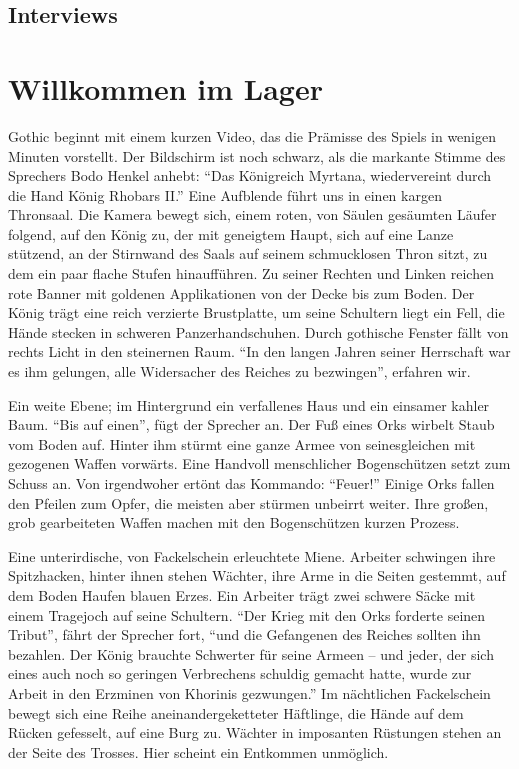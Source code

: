 \documentclass[a5paper,pagesize,numbers=noenddot]{scrbook}
\begin{document}
\section{Interviews}\label{ch:quellen_interviews}


\chapter{Willkommen im Lager}\label{ch:willkommen}
Gothic beginnt mit einem kurzen Video, das die Prämisse des Spiels in wenigen Minuten vorstellt.
Der Bildschirm ist noch schwarz, als die markante Stimme des Sprechers Bodo Henkel anhebt:
\enquote{Das Königreich Myrtana, wiedervereint durch die Hand König Rhobars II.}
Eine Aufblende führt uns in einen kargen Thronsaal.
Die Kamera bewegt sich, einem roten, von Säulen gesäumten Läufer folgend, auf den König zu, der mit geneigtem Haupt, sich auf eine Lanze stützend, an der Stirnwand des Saals auf seinem schmucklosen Thron sitzt, zu dem ein paar flache Stufen hinaufführen.
Zu seiner Rechten und Linken reichen rote Banner mit goldenen Applikationen von der Decke bis zum Boden.
Der König trägt eine reich verzierte Brustplatte, um seine Schultern liegt ein Fell, die Hände stecken in schweren Panzerhandschuhen.
Durch gothische Fenster fällt von rechts Licht in den steinernen Raum.
\enquote{In den langen Jahren seiner Herrschaft war es ihm gelungen, alle Widersacher des Reiches zu bezwingen}, erfahren wir.

Ein weite Ebene; im Hintergrund ein verfallenes Haus und ein einsamer kahler Baum.
\enquote{Bis auf einen}, fügt der Sprecher an.
Der Fuß eines Orks wirbelt Staub vom Boden auf.
Hinter ihm stürmt eine ganze Armee von seinesgleichen mit gezogenen Waffen vorwärts.
Eine Handvoll menschlicher Bogenschützen setzt zum Schuss an.
Von irgendwoher ertönt das Kommando: \enquote{Feuer!}
Einige Orks fallen den Pfeilen zum Opfer, die meisten aber stürmen unbeirrt weiter.
Ihre großen, grob gearbeiteten Waffen machen mit den Bogenschützen kurzen Prozess.

Eine unterirdische, von Fackelschein erleuchtete Miene.
Arbeiter schwingen ihre Spitzhacken, hinter ihnen stehen Wächter, ihre Arme in die Seiten gestemmt, auf dem Boden Haufen blauen Erzes.
Ein Arbeiter trägt zwei schwere Säcke mit einem Tragejoch auf seine Schultern.
\enquote{Der Krieg mit den Orks forderte seinen Tribut}, fährt der Sprecher fort, \enquote{und die Gefangenen des Reiches sollten ihn bezahlen.
Der König brauchte Schwerter für seine Armeen -- und jeder, der sich eines auch noch so geringen Verbrechens schuldig gemacht hatte, wurde zur Arbeit in den Erzminen von Khorinis gezwungen.}
Im nächtlichen Fackelschein bewegt sich eine Reihe aneinandergeketteter Häftlinge, die Hände auf dem Rücken gefesselt, auf eine Burg zu.
Wächter in imposanten Rüstungen stehen an der Seite des Trosses.
Hier scheint ein Entkommen unmöglich.
\end{document}
